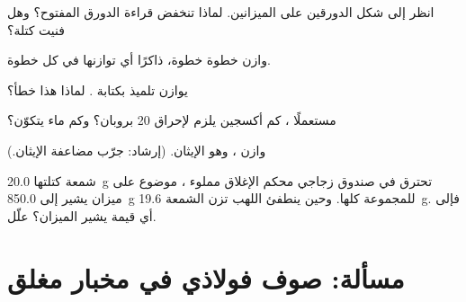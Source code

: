 \begin{exercise}[$\star\star$]\label{exo:g8:balanced-equations:7}
انظر إلى شكل الدورقين على الميزانين. لماذا تنخفض قراءة الدورق المفتوح؟
وهل فنيت كتلة؟
\end{exercise}

\begin{exercise}[$\star\star$]\label{exo:g8:balanced-equations:8}
وازن  خطوة خطوة، ذاكرًا أي  %
توازنها في كل خطوة.
\end{exercise}

\begin{exercise}[$\star\star$]\label{exo:g8:balanced-equations:9}
يوازن تلميذ  بكتابة . %
لماذا هذا خطأ؟
\end{exercise}

\begin{exercise}[$\star\star$]\label{exo:g8:balanced-equations:10}
مستعملًا ، كم  أكسجين يلزم
لإحراق 20  بروبان؟ وكم  ماء
يتكوّن؟
\end{exercise}

\begin{exercise}[$\star\star\star$]\label{exo:g8:balanced-equations:11}
وازن ، وهو  الإيثان. (إرشاد: جرّب %
مضاعفة الإيثان.)
\end{exercise}

\begin{exercise}[$\star\star\star$]\label{exo:g8:balanced-equations:12}
شمعة كتلتها \qty{20.0}{g} تحترق في صندوق زجاجي محكم الإغلاق مملوء ،
موضوع على ميزان يشير إلى \qty{850.0}{g} للمجموعة كلها. وحين ينطفئ اللهب
تزن الشمعة \qty{19.6}{g}. فإلى أي قيمة يشير الميزان؟ علّل.
\end{exercise}

\section{مسألة: صوف فولاذي في مخبار مغلق}


